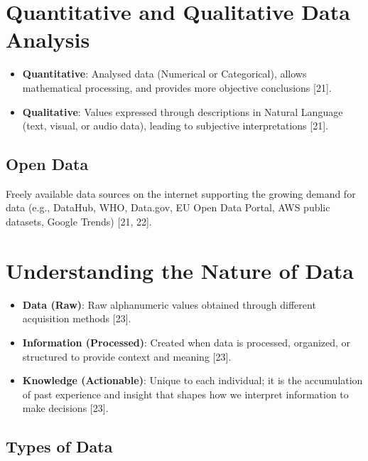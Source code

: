 \documentclass[
  letterpaper,
  DIV=11,
  numbers=noendperiod]{scrreprt}
\providecommand{\tightlist}{%
  \setlength{\itemsep}{0pt}\setlength{\parskip}{0pt}}
\begin{document}
\section{Quantitative and Qualitative Data
Analysis}\label{quantitative-and-qualitative-data-analysis}

\begin{itemize}
\tightlist
\item
  \textbf{Quantitative}: Analysed data (Numerical or Categorical),
  allows mathematical processing, and provides more objective
  conclusions {[}21{]}.
\item
  \textbf{Qualitative}: Values expressed through descriptions in Natural
  Language (text, visual, or audio data), leading to subjective
  interpretations {[}21{]}.
\end{itemize}

\subsection{Open Data}\label{open-data}

Freely available data sources on the internet supporting the growing
demand for data (e.g., DataHub, WHO, Data.gov, EU Open Data Portal, AWS
public datasets, Google Trends) {[}21, 22{]}.

\section{Understanding the Nature of
Data}\label{understanding-the-nature-of-data}

\begin{itemize}
\tightlist
\item
  \textbf{Data (Raw)}: Raw alphanumeric values obtained through
  different acquisition methods {[}23{]}.
\item
  \textbf{Information (Processed)}: Created when data is processed,
  organized, or structured to provide context and meaning {[}23{]}.
\item
  \textbf{Knowledge (Actionable)}: Unique to each individual; it is the
  accumulation of past experience and insight that shapes how we
  interpret information to make decisions {[}23{]}.
\end{itemize}

\subsection{Types of Data}\label{types-of-data}
\end{document}
